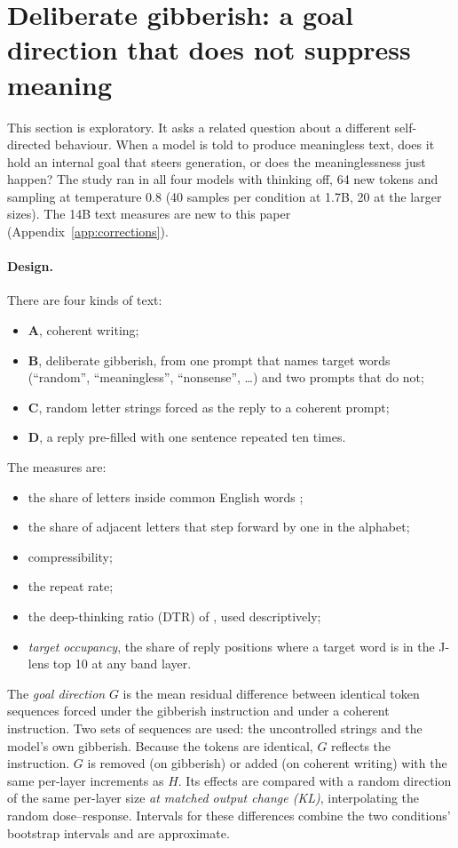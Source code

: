 \documentclass[11pt]{article}
\begin{document}
\section{Deliberate gibberish: a goal direction that does not suppress meaning}\label{sec:gib}

This section is exploratory. It asks a related question about a different self-directed behaviour. When a model is told to produce meaningless text, does it hold an internal goal that steers generation, or does the meaninglessness just happen? The study ran in all four models with thinking off, 64 new tokens and sampling at temperature 0.8 (40 samples per condition at 1.7B, 20 at the larger sizes). The 14B text measures are new to this paper (Appendix~\ref{app:corrections}).

\paragraph{Design.} There are four kinds of text:
\begin{itemize}
  \item \textbf{A}, coherent writing;
  \item \textbf{B}, deliberate gibberish, from one prompt that names target words (``random'', ``meaningless'', ``nonsense'', \dots) and two prompts that do not;
  \item \textbf{C}, random letter strings forced as the reply to a coherent prompt;
  \item \textbf{D}, a reply pre-filled with one sentence repeated ten times.
\end{itemize}
The measures are:
\begin{itemize}
  \item the share of letters inside common English words \citep{speer2022wordfreq};
  \item the share of adjacent letters that step forward by one in the alphabet;
  \item compressibility;
  \item the repeat rate;
  \item the deep-thinking ratio (DTR) of \citet{chen2026thinkdeep}, used descriptively;
  \item \emph{target occupancy}, the share of reply positions where a target word is in the J-lens top 10 at any band layer.
\end{itemize}
The \emph{goal direction} $G$ is the mean residual difference between identical token sequences forced under the gibberish instruction and under a coherent instruction. Two sets of sequences are used: the uncontrolled strings and the model's own gibberish. Because the tokens are identical, $G$ reflects the instruction. $G$ is removed (on gibberish) or added (on coherent writing) with the same per-layer increments as $H$. Its effects are compared with a random direction of the same per-layer size \emph{at matched output change (KL)}, interpolating the random dose--response. Intervals for these differences combine the two conditions' bootstrap intervals and are approximate.
\end{document}
